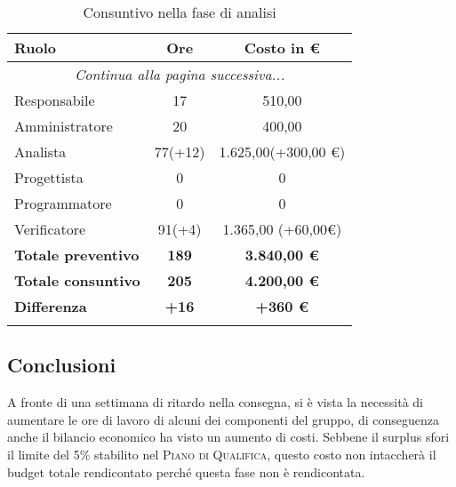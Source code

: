 \documentclass[../piano_di_progetto.tex]{subfiles}
\begin{document}
\begin{center}
	\begin{longtable}{|l|c|c|}
		\hline
		\rowcolor{lightgray}
		\textbf{Ruolo} & \textbf{Ore} & \textbf{Costo in €}\\
		\hline
		\endhead
		
		\hline
		\multicolumn{3}{|c|}{\emph{Continua alla pagina successiva...}}\\
		\hline
		\endfoot

		\endlastfoot
		Responsabile & 17 & 510,00 \\
		Amministratore & 20 & 400,00 \\
		Analista & 77(+12) & 1.625,00(+300,00 €) \\
		Progettista &    0       & 0 \\
		Programmatore &  0       & 0 \\
		Verificatore &   91(+4)      & 1.365,00 (+60,00€) \\
		\hline
		\textbf{Totale preventivo} & \textbf{189} & \textbf{3.840,00 €} \\
		\hline
		\textbf{Totale consuntivo} & \textbf{205	} & \textbf{4.200,00 €} \\
		\hline
		\textbf{Differenza} & \textbf{+16} & \textbf{+360 €}\\
		\hline
		\rowcolor{white}
		\caption{Consuntivo nella fase di analisi}
	\end{longtable}
\end{center}

\subsection{ Conclusioni}%
\label{sub:cons_fine}
A fronte di una settimana di ritardo nella consegna, si è vista la necessità di aumentare le ore di lavoro di alcuni dei componenti del gruppo, di conseguenza anche il bilancio economico ha visto un aumento di costi. Sebbene il surplus sfori il limite del 5\% stabilito nel \textsc{Piano di Qualifica}, questo costo non intaccherà il budget totale rendicontato perché questa fase non è rendicontata.
\end{document}
